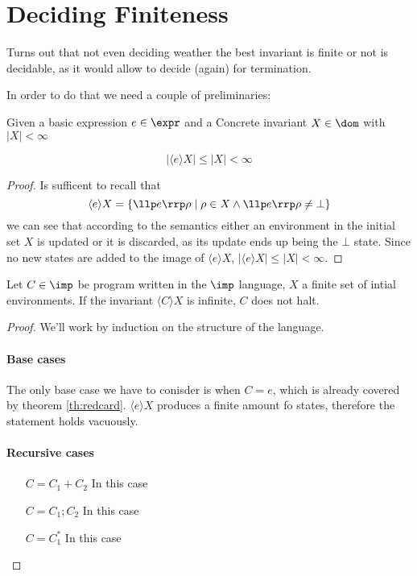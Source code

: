 \section{Deciding Finiteness}
Turns out that not even deciding weather the best invariant is finite
or not is decidable, as it would allow to decide (again) for
termination.

In order to do that we need a couple of preliminaries:

\begin{theorem}\label{th:redcard}
  Given a basic expression \(e \in \expr\) and a Concrete invariant
  \(X \in \dom\) with \(|X| < \infty\)

  \[ | \langle e \rangle X | \leq |X| < \infty \]

  \begin{proof}
    Is sufficent to recall that \[\langle e \rangle X = \{ \llp e \rrp
    \rho \mid \rho \in X \wedge \llp e \rrp \rho \neq \bot \} \] we
    can see that according to the semantics either an environment in
    the initial set \(X\) is updated or it is discarded, as its update
    ends up being the \(\bot\) state. Since no new states are added to
    the image of \(\langle e \rangle X\), \(|\langle e \rangle X| \leq
    |X| < \infty\).
  \end{proof}

\end{theorem}

\begin{theorem}
  \label{th:infinvnonterm}
  Let \(C\in \imp\) be program written in the \(\imp\) language, \(X\)
  a finite set of intial environments. If the invariant \(\langle C
  \rangle X\) is infinite, \(C\) does not halt.
  \begin{proof}
    We'll work by induction on the structure of the language.
    \paragraph*{Base cases\\}
    The only base case we have to conisder is when \(C = e\), which is
    already covered by theorem \ref{th:redcard}. \(\langle e \rangle
    X\) produces a finite amount fo states, therefore the statement
    holds vacuously.

    \paragraph*{Recursive cases\\}
    \begin{itemize}
    \item[\(C = C_1 + C_2\)] In this case
    \item[\(C = C_1;C_2\)] In this case
    \item[\(C = C_1^*\)] In this case 
    \end{itemize}
  \end{proof}
\end{theorem}

